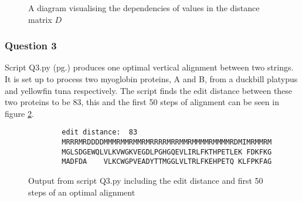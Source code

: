 \documentclass[a4paper]{article}
\begin{document}
\begin{figure}[H]
    \centering
    \caption{A diagram visualising the dependencies of values in the distance matrix $D$}
    \label{fig:q2}
\end{figure}

\subsubsection*{Question 3}

Script Q3.py (pg.\pageref{PQ3}) produces one optimal vertical alignment between two strings. It is set up to process two myoglobin proteins, A and B, from a duckbill platypus and yellowfin tuna respectively. The script finds the edit distance between these two proteins to be 83, this and the first 50 steps of alignment can be seen in figure \ref{fig:q3}.
\begin{figure}[H]
    \centering
    \begin{verbatim}
        edit distance:  83
        MRRRMRDDDDMMMRMMRMMRMRRRRMRRMMRMMMMRMMMMRDMIMRMMRM
        MGLSDGEWQLVLKVWGKVEGDLPGHGQEVLIRLFKTHPETLEK FDKFKG
        MADFDA    VLKCWGPVEADYTTMGGLVLTRLFKEHPETQ KLFPKFAG
    \end{verbatim}
    \caption{Output from script Q3.py including the edit distance and first 50 steps of an optimal alignment}
    \label{fig:q3}
\end{figure}
\end{document}
